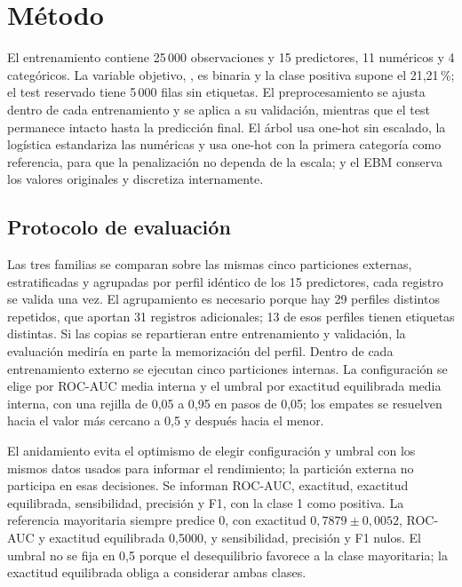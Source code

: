 \section{Método}\label{sec:method}

El entrenamiento contiene 25\,000 observaciones y 15 predictores, 11 numéricos y 4 categóricos. La variable objetivo, , es binaria y la clase positiva supone el 21,21\,\%; el test reservado tiene 5\,000 filas sin etiquetas. El preprocesamiento se ajusta dentro de cada entrenamiento y se aplica a su validación, mientras que el test permanece intacto hasta la predicción final. El árbol usa one-hot sin escalado, la logística estandariza las numéricas y usa one-hot con la primera categoría como referencia, para que la penalización no dependa de la escala; y el EBM conserva los valores originales y discretiza internamente.

\subsection{Protocolo de evaluación}

Las tres familias se comparan sobre las mismas cinco particiones externas, estratificadas y agrupadas por perfil idéntico de los 15 predictores, cada registro se valida una vez. El agrupamiento es necesario porque hay 29 perfiles distintos repetidos, que aportan 31 registros adicionales; 13 de esos perfiles tienen etiquetas distintas. Si las copias se repartieran entre entrenamiento y validación, la evaluación mediría en parte la memorización del perfil. Dentro de cada entrenamiento externo se ejecutan cinco particiones internas. La configuración se elige por ROC-AUC media interna y el umbral por exactitud equilibrada media interna, con una rejilla de 0,05 a 0,95 en pasos de 0,05; los empates se resuelven hacia el valor más cercano a 0,5 y después hacia el menor.

El anidamiento evita el optimismo de elegir configuración y umbral con los mismos datos usados para informar el rendimiento; la partición externa no participa en esas decisiones. Se informan ROC-AUC, exactitud, exactitud equilibrada, sensibilidad, precisión y F1, con la clase 1 como positiva. La referencia mayoritaria siempre predice 0, con exactitud $0{,}7879 \pm 0{,}0052$, ROC-AUC y exactitud equilibrada 0,5000, y sensibilidad, precisión y F1 nulos. El umbral no se fija en 0,5 porque el desequilibrio favorece a la clase mayoritaria; la exactitud equilibrada obliga a considerar ambas clases.

